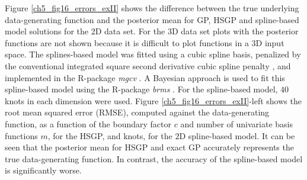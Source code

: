 



{\color{blue} Figure \ref{ch5_fig16_errors_exII} shows the difference  between the true underlying data-generating function and the posterior mean for GP, HSGP and spline-based model solutions for the $2$D data set. For the $3$D data set plots with the posterior functions are not shown because it is difficult to plot functions in a $3$D input space.} The splines-based model was fitted using a cubic spline basis, penalized by the conventional integrated square second derivative cubic spline penalty \citep{wood2017generalized}, and implemented in the R-package \textit{mgcv} \citep{wood2011mgcv}. A Bayesian approach is used to fit this spline-based model using the R-package \textit{brms} \citep{burkner2017brms}. For the spline-based model, $40$ knots in each dimension were used. Figure \ref{ch5_fig16_errors_exII}-left shows the root mean squared error (RMSE), computed against the data-generating function, as a function of the boundary factor $c$ and number of univariate basis functions $m$, for the HSGP, and knots, for the $2$D spline-based model. It can be seen that the posterior mean for HSGP and exact GP accurately represents the true data-generating function. In contrast, the accuracy of the spline-based model is significantly worse. 

